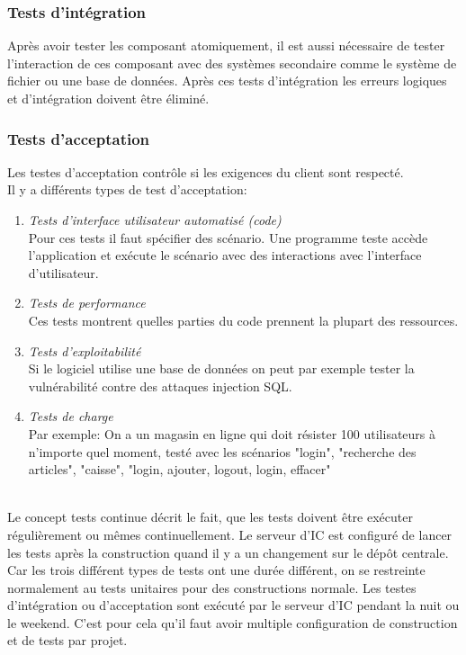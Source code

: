 \subsubsection{Tests d'intégration}
Après avoir tester les composant atomiquement, il est aussi nécessaire de tester l'interaction de ces composant avec des systèmes secondaire comme le système de fichier ou une base de données. Après ces tests d'intégration les erreurs logiques et d'intégration doivent être éliminé.
\subsubsection{Tests d'acceptation}
Les testes d'acceptation contrôle si les exigences du client sont respecté. \\
Il y a différents types de test d'acceptation:
\begin{enumerate}
 \item \textit{Tests d'interface utilisateur automatisé (code)}
 \\Pour ces tests il faut spécifier des scénario. Une programme teste accède l'application et exécute le scénario avec des interactions avec l'interface d'utilisateur.
 \item \textit{Tests de performance}
 \\Ces tests montrent quelles parties du code prennent la plupart des ressources.
 \item \textit{Tests d'exploitabilité}
 \\Si le logiciel utilise une base de données on peut par exemple tester la vulnérabilité contre des attaques injection SQL.
 \item \textit{Tests de charge}
 \\Par exemple: On a un magasin en ligne qui doit résister 100 utilisateurs à n'importe quel moment, testé avec les scénarios "login", "recherche des articles", "caisse", "login, ajouter, logout, login, effacer"
\end{enumerate}
\ \\
Le concept tests continue décrit le fait, que les tests doivent être exécuter régulièrement ou mêmes continuellement. Le serveur d'IC est configuré de lancer les tests après la construction quand il y a un changement sur le dépôt centrale. Car les trois différent types de tests ont une durée différent, on se restreinte normalement au tests unitaires pour des constructions normale. Les testes d'intégration ou d'acceptation sont exécuté par le serveur d'IC pendant la nuit ou le weekend. C'est pour cela qu'il faut avoir multiple configuration de construction et de tests par projet.
\newpage

